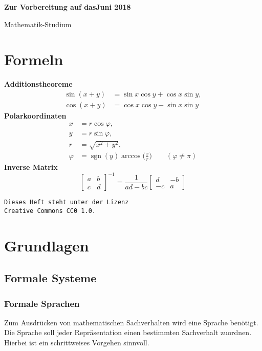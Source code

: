 \documentclass[a4paper,11pt,fleqn,twoside]{scrartcl}
\numberwithin{equation}{section}
\newcommand{\strong}[1]{{\normalfont\sffamily\bfseries #1}}
\theoremstyle{rmbox}
\begin{document}
\thispagestyle{empty}

\noindent
{\huge\sffamily\bfseries
Zur Vorbereitung auf das\hfill {\normalsize\rmfamily\mdseries Juni 2018}
\par\noindent
Mathematik-Studium
\par}

\tableofcontents

\newpage
\section*{Formeln}
\strong{Additionstheoreme}
\begin{align*}
\sin(x+y) &= \sin x\cos y + \cos x\sin y,\\
\cos(x+y) &= \cos x\cos y - \sin x\sin y
\end{align*}
\strong{Polarkoordinaten}
\begin{align*}
x &= r\cos\varphi,\\
y &= r\sin\varphi,\\
r &= \sqrt{x^2+y^2},\\
\varphi &= \operatorname{sgn}(y)\arccos\Big(\frac{x}{r}\Big)\qquad (\varphi\ne\pi)
\end{align*}
\strong{Inverse Matrix}
\[
\begin{bmatrix}
a & b\\
c & d
\end{bmatrix}^{-1}
= \frac{1}{ad-bc} \begin{bmatrix}
d & -b\\
-c & a
\end{bmatrix}
\]

\vfill\noindent
\texttt{Dieses Heft steht unter der Lizenz\\
Creative Commons CC0 1.0.}

\newpage

\section{Grundlagen}
\subsection{Formale Systeme}
\subsubsection{Formale Sprachen}

Zum Ausdrücken von mathematischen Sachverhalten wird eine Sprache
benötigt. Die Sprache soll jeder Repräsentation einen bestimmten
Sachverhalt zuordnen. Hierbei ist ein schrittweises Vorgehen
sinnvoll.
\end{document}
